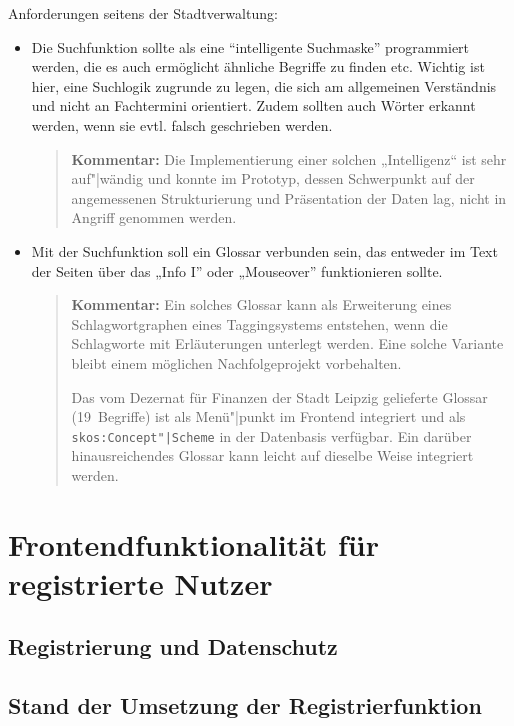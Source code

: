 \documentclass[11pt,a4paper,twoside]{article}
\newcommand{\kommentar}[1]{\begin{quote}\textbf{Kommentar:} #1 \end{quote}}
\begin{document}
Anforderungen seitens der Stadtverwaltung:
\begin{itemize}
\item Die Suchfunktion sollte als eine “intelligente Suchmaske” programmiert
  werden, die es auch ermöglicht ähnliche Begriffe zu finden etc.  Wichtig ist
  hier, eine Suchlogik zugrunde zu legen, die sich am allgemeinen Verständnis
  und nicht an Fachtermini orientiert. Zudem sollten auch Wörter erkannt
  werden, wenn sie evtl. falsch geschrieben werden.

  \kommentar{Die Implementierung einer solchen „Intelligenz“ ist sehr
    auf"|wändig und konnte im Prototyp, dessen Schwerpunkt auf der angemessenen
    Strukturierung und Präsentation der Daten lag, nicht in Angriff genommen
    werden. }

\item Mit der Suchfunktion soll ein Glossar verbunden sein, das entweder im
  Text der Seiten über das „Info I” oder „Mouseover” funktionieren sollte.

  \kommentar{Ein solches Glossar kann als Erweiterung eines Schlagwortgraphen
    eines Taggingsystems entstehen, wenn die Schlagworte mit Erläuterungen
    unterlegt werden.  Eine solche Variante bleibt einem möglichen
    Nachfolgeprojekt vorbehalten.

  Das vom Dezernat für Finanzen der Stadt Leipzig gelieferte Glossar
  (19~Begriffe) ist als Menü"|punkt im Frontend integriert und als
  \texttt{skos:Concept"|Scheme} in der Datenbasis verfügbar. Ein darüber
  hinausreichendes Glossar kann leicht auf dieselbe Weise integriert werden. }

\end{itemize}

\section{Frontendfunktionalität für registrierte Nutzer}

\subsection{Registrierung und Datenschutz} 

\subsection*{Stand der Umsetzung der Registrierfunktion} 
\end{document}

